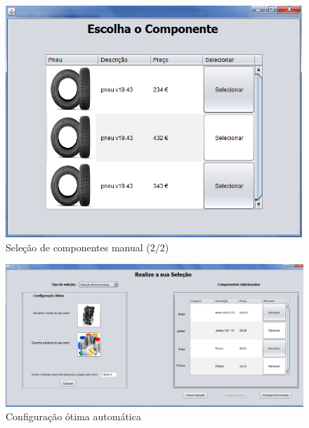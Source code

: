 \begin{figure}
    \centering
    \includegraphics[width=\textwidth]{analise_de_requisitos/img/config_selecao_componentes_manual_2.png}
    \caption{Seleção de componentes manual (2/2)}
\end{figure}

\begin{figure}
    \centering
    \includegraphics[width=\textwidth]{analise_de_requisitos/img/config_otima.png}
    \caption{Configuração ótima automática}
\end{figure}

